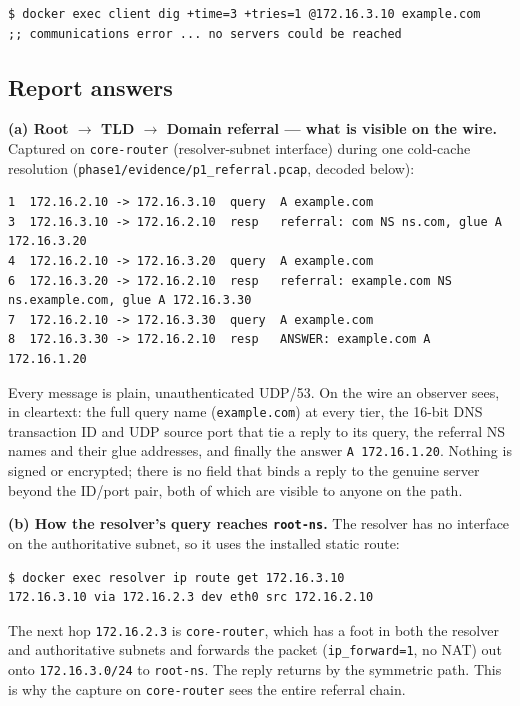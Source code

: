 \documentclass[11pt,a4paper]{article}
\begin{document}
\begin{lstlisting}
$ docker exec client dig +time=3 +tries=1 @172.16.3.10 example.com
;; communications error ... no servers could be reached
\end{lstlisting}

\subsection{Report answers}

\textbf{(a) Root $\rightarrow$ TLD $\rightarrow$ Domain referral --- what is visible on the wire.}
Captured on \texttt{core-router} (resolver-subnet interface) during one cold-cache resolution
(\texttt{phase1/evidence/p1\_referral.pcap}, decoded below):

\begin{lstlisting}
1  172.16.2.10 -> 172.16.3.10  query  A example.com
3  172.16.3.10 -> 172.16.2.10  resp   referral: com NS ns.com, glue A 172.16.3.20
4  172.16.2.10 -> 172.16.3.20  query  A example.com
6  172.16.3.20 -> 172.16.2.10  resp   referral: example.com NS ns.example.com, glue A 172.16.3.30
7  172.16.2.10 -> 172.16.3.30  query  A example.com
8  172.16.3.30 -> 172.16.2.10  resp   ANSWER: example.com A 172.16.1.20
\end{lstlisting}

Every message is plain, unauthenticated UDP/53. On the wire an observer sees, in cleartext: the
full query name (\texttt{example.com}) at every tier, the 16-bit DNS transaction ID and UDP
source port that tie a reply to its query, the referral NS names and their glue addresses, and
finally the answer \texttt{A 172.16.1.20}. Nothing is signed or encrypted; there is no field that
binds a reply to the genuine server beyond the ID/port pair, both of which are visible to anyone
on the path.

\textbf{(b) How the resolver's query reaches \texttt{root-ns}.} The resolver has no interface on
the authoritative subnet, so it uses the installed static route:

\begin{lstlisting}
$ docker exec resolver ip route get 172.16.3.10
172.16.3.10 via 172.16.2.3 dev eth0 src 172.16.2.10
\end{lstlisting}

The next hop \texttt{172.16.2.3} is \texttt{core-router}, which has a foot in both the resolver
and authoritative subnets and forwards the packet (\texttt{ip\_forward=1}, no NAT) out onto
\texttt{172.16.3.0/24} to \texttt{root-ns}. The reply returns by the symmetric path. This is why
the capture on \texttt{core-router} sees the entire referral chain.
\end{document}
